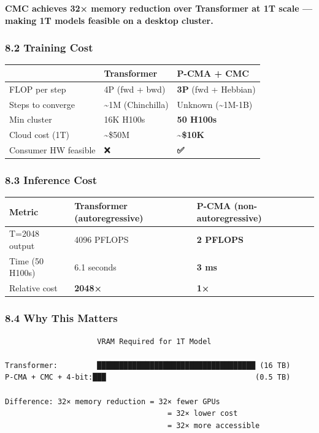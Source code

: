 \documentclass[
  11pt,
  a4paper,
]{article}
\begin{document}
\textbf{CMC achieves 32× memory reduction over Transformer at 1T scale
--- making 1T models feasible on a desktop cluster.}

\subsubsection{8.2 Training Cost}\label{training-cost}

\begin{longtable}[]{@{}lll@{}}
\toprule\noalign{}
& Transformer & P-CMA + CMC \\
\midrule\noalign{}
\endhead
\bottomrule\noalign{}
\endlastfoot
FLOP per step & 4P (fwd + bwd) & \textbf{3P} (fwd + Hebbian) \\
Steps to converge & \textasciitilde1M (Chinchilla) & Unknown
(\textasciitilde1M-1B) \\
Min cluster & 16K H100s & \textbf{50 H100s} \\
Cloud cost (1T) & \textasciitilde\$50M &
\textbf{\textasciitilde\$10K} \\
Consumer HW feasible & ❌ & \textbf{✅} \\
\end{longtable}

\subsubsection{8.3 Inference Cost}\label{inference-cost}

\begin{longtable}[]{@{}lll@{}}
\toprule\noalign{}
Metric & Transformer (autoregressive) & P-CMA (non-autoregressive) \\
\midrule\noalign{}
\endhead
\bottomrule\noalign{}
\endlastfoot
T=2048 output & 4096 PFLOPS & \textbf{2 PFLOPS} \\
Time (50 H100s) & 6.1 seconds & \textbf{3 ms} \\
Relative cost & \textbf{2048×} & \textbf{1×} \\
\end{longtable}

\subsubsection{8.4 Why This Matters}\label{why-this-matters}

\begin{verbatim}
                     VRAM Required for 1T Model
                     
Transformer:         ████████████████████████████████████ (16 TB)
P-CMA + CMC + 4-bit:███                                  (0.5 TB)

Difference: 32× memory reduction = 32× fewer GPUs
                                     = 32× lower cost
                                     = 32× more accessible
\end{verbatim}
\end{document}
